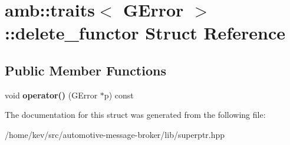 \hypertarget{structamb_1_1traits_3_01GError_01_4_1_1delete__functor}{\section{amb\+:\+:traits$<$ G\+Error $>$\+:\+:delete\+\_\+functor Struct Reference}
\label{structamb_1_1traits_3_01GError_01_4_1_1delete__functor}
}
\subsection*{Public Member Functions}
\begin{DoxyCompactItemize}
\item 
\hypertarget{structamb_1_1traits_3_01GError_01_4_1_1delete__functor_ac39ebbfad72facba5348ae7ffcbda46f}{void {\bfseries operator()} (G\+Error $\ast$p) const }\label{structamb_1_1traits_3_01GError_01_4_1_1delete__functor_ac39ebbfad72facba5348ae7ffcbda46f}

\end{DoxyCompactItemize}


The documentation for this struct was generated from the following file\+:\begin{DoxyCompactItemize}
\item 
/home/kev/src/automotive-\/message-\/broker/lib/superptr.\+hpp\end{DoxyCompactItemize}
